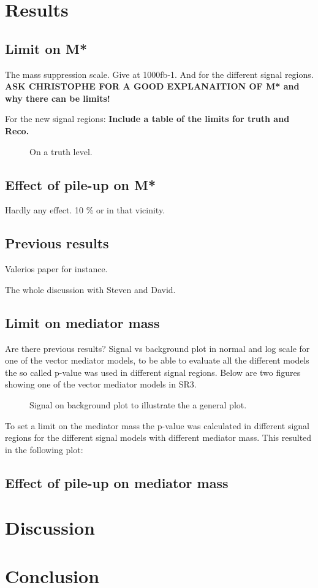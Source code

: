 \section{Results}
\subsection{Limit on M*}
The mass suppression scale.
Give at 1000fb-1. And for the different signal regions.
\textbf{ASK CHRISTOPHE FOR A GOOD EXPLANAITION OF M* and why there can be limits!}

For the new signal regions: \textbf{Include a table of the limits for truth and Reco.}
 \begin{figure}[H] %
    \hfill
    \caption{On a truth level.}
    \label{fig:SRnewM}
  \end{figure}

\subsection{Effect of pile-up on M*}
Hardly any effect. 10 \% or in that vicinity.

\subsection{Previous results}
Valerios paper for instance.

The whole discussion with Steven and David.
\subsection{Limit on mediator mass}
Are there previous results?
Signal vs background plot in normal and log scale for one of the vector mediator models, to be able to evaluate all the different models the so called p-value was used in different signal regions. Below are two figures showing one of the vector mediator models in SR3.
 \begin{figure}[H] %
    \hfill
    \caption{Signal on background plot to illustrate the a general plot. }
    \label{fig:sigback}
  \end{figure}

To set a limit on the mediator mass the p-value was calculated in different signal regions for the different signal models with different mediator mass. This resulted in the following plot:


\subsection{Effect of pile-up on mediator mass}
\section{Discussion}
\section{Conclusion}